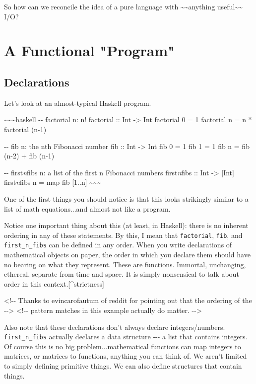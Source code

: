 \documentclass[]{article}
\begin{document}
So how can we reconcile the idea of a pure language with
\textasciitilde{}\textasciitilde{}anything
useful\textasciitilde{}\textasciitilde{} I/O?

\section{A Functional "Program"}

\subsection{Declarations}

Let's look at an almost-typical Haskell program.

\textasciitilde{}\textasciitilde{}\textasciitilde{}haskell -\/- factorial n: n!
factorial :: Int -\textgreater{} Int factorial 0 = 1 factorial n = n * factorial
(n-1)

-\/- fib n: the nth Fibonacci number fib :: Int -\textgreater{} Int fib 0 = 1
fib 1 = 1 fib n = fib (n-2) + fib (n-1)

-\/- first\emph{n}fibs n: a list of the first n Fibonacci numbers
first\emph{n}fibs :: Int -\textgreater{} {[}Int{]} first\emph{n}fibs n = map fib
{[}1..n{]} \textasciitilde{}\textasciitilde{}\textasciitilde{}

One of the first things you should notice is that this looks strikingly similar
to a list of math equations...and almost not like a program.

Notice one important thing about this (at least, in Haskell): there is no
inherent ordering in any of these statements. By this, I mean that
\texttt{factorial}, \texttt{fib}, and \texttt{first\_n\_fibs} can be defined in
any order. When you write declarations of mathematical objects on paper, the
order in which you declare them should have no bearing on what they represent.
These are functions. Immortal, unchanging, ethereal, separate from time and
space. It is simply nonsensical to talk about order in this
context.{[}\^{}strictness{]}

\textless{}!-\/- Thanks to evincarofautum of reddit for pointing out that the
ordering of the -\/-\textgreater{} \textless{}!-\/- pattern matches in this
example actually do matter. -\/-\textgreater{}

Also note that these declarations don't always declare integers/numbers.
\texttt{first\_n\_fibs} actually declares a data structure -\/-\/- a list that
contains integers. Of course this is no big problem...mathematical functions can
map integers to matrices, or matrices to functions, anything you can think of.
We aren't limited to simply defining primitive things. We can also define
structures that contain things.
\end{document}
